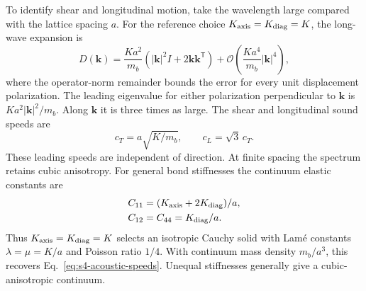 \documentclass[10pt,aps,onecolumn,floatfix,notitlepage,nofootinbib,showkeys]{revtex4-2}
\newcommand{\vk}{\bm{k}}
\newcommand{\order}{\mathcal O}
\begin{document}
To identify shear and longitudinal motion, take the wavelength large compared with the lattice spacing $a$. For the reference choice $K_{\rm axis}=K_{\rm diag}=K$, the long-wave expansion is
\begin{equation}
  D(\vk)
  =\frac{Ka^2}{m_b}
   \left(|\vk|^2 I+2\vk\vk^{\mathsf T}\right)
   +\order\!\left(\frac{Ka^4}{m_b}|\vk|^4\right),
  \label{eq:s4-long-wave}
\end{equation}
where the operator-norm remainder bounds the error for every unit displacement polarization. The leading eigenvalue for either polarization perpendicular to $\vk$ is $Ka^2|\vk|^2/m_b$. Along $\vk$ it is three times as large. The shear and longitudinal sound speeds are
\begin{equation}
  c_T=a\sqrt{K/m_b},
  \qquad
  c_L=\sqrt3\,c_T.
  \label{eq:s4-acoustic-speeds}
\end{equation}
These leading speeds are independent of direction. At finite spacing the spectrum retains cubic anisotropy. For general bond stiffnesses the continuum elastic constants are
\begin{equation}
\begin{aligned}
 C_{11}&=(K_{\rm axis}+2K_{\rm diag})/a,\\
 C_{12}&=C_{44}=K_{\rm diag}/a.
\end{aligned}
\label{eq:s4-cauchy-constants}
\end{equation}
Thus $K_{\rm axis}=K_{\rm diag}=K$ selects an isotropic Cauchy solid with Lam\'e constants $\lambda=\mu=K/a$ and Poisson ratio $1/4$. With continuum mass density $m_b/a^3$, this recovers Eq.~\eqref{eq:s4-acoustic-speeds}. Unequal stiffnesses generally give a cubic-anisotropic continuum.
\end{document}
